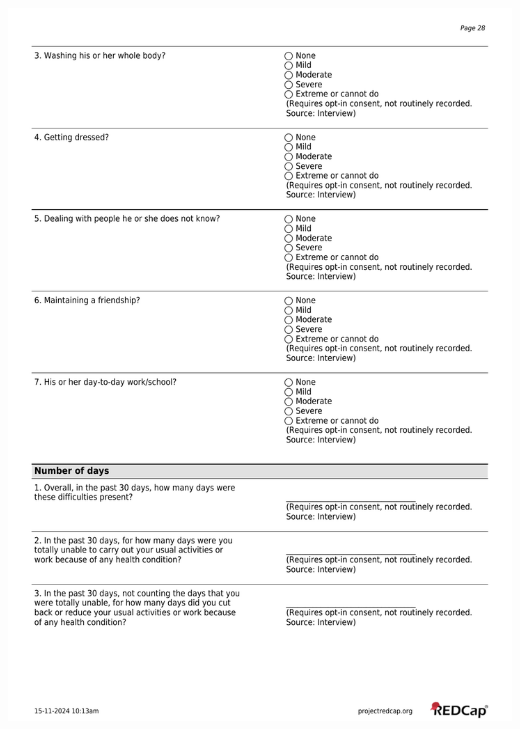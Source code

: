 \documentclass[
]{scrartcl}
\begin{document}
\includegraphics{../case-record-form/instrument-pdfs/pages/all-instruments-28.pdf}
\end{document}
